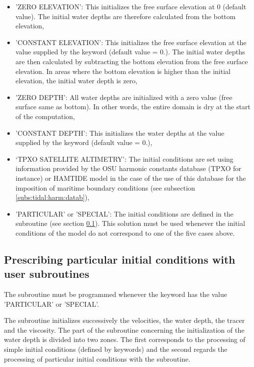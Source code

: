 \begin{itemize}
\item 'ZERO ELEVATION': This initializes the free surface elevation at 0
(default value).
The initial water depths are therefore calculated from the bottom elevation,

\item 'CONSTANT ELEVATION': This initializes the free surface elevation
at the value supplied by the keyword 
(default value = 0.).
The initial water depths are then calculated by subtracting
the bottom elevation from the free surface elevation.
In areas where the bottom elevation is higher than the initial elevation,
the initial water depth is zero,

\item 'ZERO DEPTH': All water depths are initialized with a zero value
(free surface same as bottom).
In other words, the entire domain is dry at the start of the computation,

\item 'CONSTANT DEPTH': This initializes the water depths at the value
supplied by the keyword  (default value = 0.),

\item `TPXO SATELLITE ALTIMETRY': The initial conditions are set using
information provided by the OSU harmonic constants database (TPXO for instance)
or HAMTIDE model
in the case of the use of this database for the imposition of maritime boundary
conditions (see subsection \ref{subs:tidal:harm:datab}),

\item 'PARTICULAR' or 'SPECIAL': The initial conditions are defined in the
 subroutine (see section \ref{subs:presc:CONDIN}).
This solution must be used whenever the initial conditions of the model
do not correspond to one of the five cases above.
\end{itemize}


\subsection{Prescribing particular initial conditions with user subroutines}
\label{subs:presc:CONDIN}

The  subroutine must be programmed whenever the keyword
 has the value 'PARTICULAR' or 'SPECIAL'.

The  subroutine initializes successively the velocities,
the water depth, the tracer and the viscosity.
The part of the subroutine concerning the initialization of the water depth
is divided into two zones.
The first corresponds to the processing of simple initial conditions
(defined by keywords)
and the second regards the processing of particular initial conditions
with the  subroutine.

